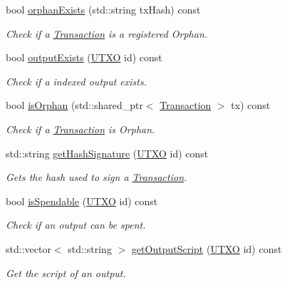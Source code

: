 \begin{DoxyCompactItemize}
bool \mbox{\hyperlink{classMempool_aef85ab57fba69a29f857d805a54a5358}{orphan\+Exists}} (std\+::string tx\+Hash) const
\begin{DoxyCompactList}\small\item\em Check if a \mbox{\hyperlink{classTransaction}{Transaction}} is a registered Orphan. \end{DoxyCompactList}\item 
bool \mbox{\hyperlink{classMempool_ad72ddf2809bf532f2b6c0f09922a77db}{output\+Exists}} (\mbox{\hyperlink{utxo_8hpp_a19091d002da03ec92277e19295ac4540}{U\+T\+XO}} id) const
\begin{DoxyCompactList}\small\item\em Check if a indexed output exists. \end{DoxyCompactList}\item 
bool \mbox{\hyperlink{classMempool_a6ccb56de239266bd5cebafac3112b31e}{is\+Orphan}} (std\+::shared\+\_\+ptr$<$ \mbox{\hyperlink{classTransaction}{Transaction}} $>$ tx) const
\begin{DoxyCompactList}\small\item\em Check if a \mbox{\hyperlink{classTransaction}{Transaction}} is Orphan. \end{DoxyCompactList}\item 
std\+::string \mbox{\hyperlink{classMempool_a93dc7c390ae5b561219cd654beddc36a}{get\+Hash\+Signature}} (\mbox{\hyperlink{utxo_8hpp_a19091d002da03ec92277e19295ac4540}{U\+T\+XO}} id) const
\begin{DoxyCompactList}\small\item\em Gets the hash used to sign a \mbox{\hyperlink{classTransaction}{Transaction}}. \end{DoxyCompactList}\item 
bool \mbox{\hyperlink{classMempool_a6ac1288e72c47a9c63841696901d7f3c}{is\+Spendable}} (\mbox{\hyperlink{utxo_8hpp_a19091d002da03ec92277e19295ac4540}{U\+T\+XO}} id) const
\begin{DoxyCompactList}\small\item\em Check if an output can be spent. \end{DoxyCompactList}\item 
std\+::vector$<$ std\+::string $>$ \mbox{\hyperlink{classMempool_ae76e6aba14cedd96990b40d08c47ad1d}{get\+Output\+Script}} (\mbox{\hyperlink{utxo_8hpp_a19091d002da03ec92277e19295ac4540}{U\+T\+XO}} id) const
\begin{DoxyCompactList}\small\item\em Get the script of an output. \end{DoxyCompactList}\item 

\end{DoxyCompactItemize}
